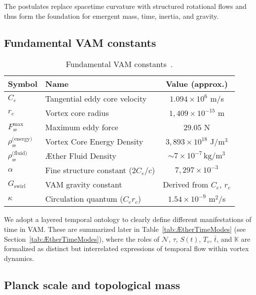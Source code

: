 The postulates replace spacetime curvature with structured rotational flows and thus form the foundation for emergent mass, time, inertia, and gravity.

\subsection*{Fundamental VAM constants}

\begin{table}[htbp]
    \centering
    \begin{tabular}{llc}
        \hline
        \toprule
        \textbf{Symbol} & \textbf{Name} & \textbf{Value (approx.)} \\
        \hline
        \midrule
        $C_e$ & Tangential eddy core velocity & $1.094 \times 10^6$ m/s \\
        $r_c$ & Vortex core radius & $1,409 \times 10^{-15}$ m \\
        $F^{\text{max}}_{\text{\ae}}$ & Maximum eddy force & $29.05$ N \\
        $\rho_\text{\ae}^\text{(energy)}$ & Vortex Core Energy Density & $3,893 \times 10^{18}$ J/m$^3$ \\
        $\rho_\text{\ae}^\text{(fluid)}$ &  Æther Fluid Density & $\sim 7 \times 10^{-7}\, \mathrm{kg/m^3}$ \\
        $\alpha$ & Fine structure constant ($2 C_e/c$) & $7,297 \times 10^{-3}$\\
        $G_\text{swirl}$ & VAM gravity constant & Derived from $C_e$, $r_c$\\
        $\kappa$ & Circulation quantum ($C_e r_c$) & $1.54 \times 10^{-9}$ m$^2$/s \\
        \hline
        \bottomrule
    \end{tabular}
    \caption{Fundamental VAM constants~\cite{vam2025field}.}
    \label{tab:VAMconstants}
\end{table}

We adopt a layered temporal ontology to clearly define different manifestations of time in VAM. These are summarized later in Table~\ref{tab:ÆtherTimeModes} (see Section~\ref{tab:ÆtherTimeModes}), where the roles of $\mathcal{N}$, $\tau$, $S(t)$, $T_v$, $\bar{t}$, and $\mathbb{K}$ are formalized as distinct but interrelated expressions of temporal flow within vortex dynamics.


\subsection*{Planck scale and topological mass}

